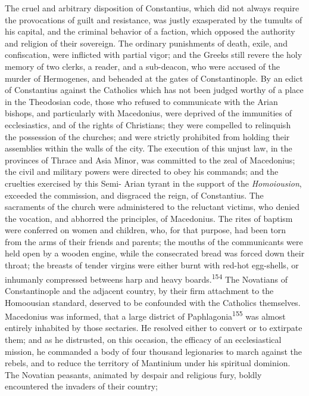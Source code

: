 The cruel and arbitrary disposition of Constantius, which did not
always require the provocations of guilt and resistance, was
justly exasperated by the tumults of his capital, and the
criminal behavior of a faction, which opposed the authority and
religion of their sovereign. The ordinary punishments of death,
exile, and confiscation, were inflicted with partial vigor; and
the Greeks still revere the holy memory of two clerks, a reader,
and a sub-deacon, who were accused of the murder of Hermogenes,
and beheaded at the gates of Constantinople. By an edict of
Constantius against the Catholics which has not been judged
worthy of a place in the Theodosian code, those who refused to
communicate with the Arian bishops, and particularly with
Macedonius, were deprived of the immunities of ecclesiastics, and
of the rights of Christians; they were compelled to relinquish
the possession of the churches; and were strictly prohibited from
holding their assemblies within the walls of the city. The
execution of this unjust law, in the provinces of Thrace and Asia
Minor, was committed to the zeal of Macedonius; the civil and
military powers were directed to obey his commands; and the
cruelties exercised by this Semi- Arian tyrant in the support of
the \textit{Homoiousion}, exceeded the commission, and disgraced the
reign, of Constantius. The sacraments of the church were
administered to the reluctant victims, who denied the vocation,
and abhorred the principles, of Macedonius. The rites of baptism
were conferred on women and children, who, for that purpose, had
been torn from the arms of their friends and parents; the mouths
of the communicants were held open by a wooden engine, while the
consecrated bread was forced down their throat; the breasts of
tender virgins were either burnt with red-hot egg-shells, or
inhumanly compressed betweens harp and heavy boards.\textsuperscript{154} The
Novatians of Constantinople and the adjacent country, by their
firm attachment to the Homoousian standard, deserved to be
confounded with the Catholics themselves. Macedonius was
informed, that a large district of Paphlagonia\textsuperscript{155} was almost
entirely inhabited by those sectaries. He resolved either to
convert or to extirpate them; and as he distrusted, on this
occasion, the efficacy of an ecclesiastical mission, he commanded
a body of four thousand legionaries to march against the rebels,
and to reduce the territory of Mantinium under his spiritual
dominion. The Novatian peasants, animated by despair and
religious fury, boldly encountered the invaders of their country;
